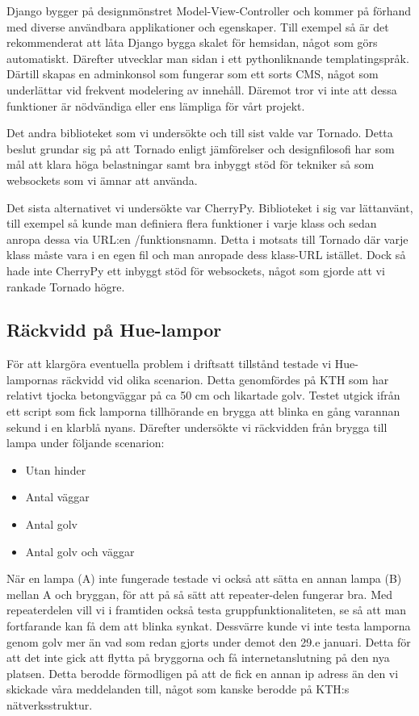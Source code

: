 \documentclass[a4paper,11pt]{article}
\begin{document}
   Django bygger på designmönstret Model-View-Controller och kommer på
   förhand med diverse användbara applikationer och egenskaper. Till exempel
   så är det rekommenderat att låta Django bygga skalet för hemsidan, något
   som görs automatiskt. Därefter utvecklar man sidan i ett pythonliknande
   templatingspråk. Därtill skapas en adminkonsol som fungerar som ett sorts
   CMS, något som underlättar vid frekvent modelering av innehåll.
   Däremot tror vi inte att dessa funktioner är nödvändiga eller ens 
   lämpliga för vårt projekt.

   Det andra biblioteket som vi undersökte och till sist valde var Tornado.
   Detta beslut grundar sig på att Tornado enligt jämförelser och
   designfilosofi har som mål att klara höga belastningar samt bra inbyggt 
   stöd för tekniker så som websockets som
   vi ämnar att använda.

   Det sista alternativet vi undersökte var CherryPy. Biblioteket i sig
   var lättanvänt, till exempel så kunde man definiera flera funktioner i
   varje klass och sedan anropa dessa via URL:en /funktionsnamn. Detta i 
   motsats till Tornado där varje klass måste vara i en egen fil och man
   anropade dess klass-URL istället. Dock så hade inte CherryPy ett inbyggt
   stöd för websockets, något som gjorde att vi rankade Tornado högre.


\subsection{Räckvidd på Hue-lampor}

   För att klargöra eventuella problem i driftsatt tillstånd testade vi Hue-
   lampornas räckvidd vid olika scenarion. Detta genomfördes på KTH som har
   relativt tjocka betongväggar på ca 50 cm och likartade golv.
   Testet utgick ifrån ett script som fick lamporna tillhörande en brygga att
   blinka en gång varannan sekund i en klarblå nyans. Därefter undersökte vi
   räckvidden från brygga till lampa under följande scenarion:

   \begin{itemize}
     \item Utan hinder
     \item Antal väggar
     \item Antal golv
     \item Antal golv och väggar
   \end{itemize}

   När en lampa (A) inte fungerade testade vi också att sätta en annan lampa (B)
   mellan A och bryggan, för att på så sätt att repeater-delen fungerar bra. Med
   repeaterdelen  vill vi i framtiden också testa gruppfunktionaliteten, se så
   att man fortfarande kan få dem att blinka synkat.
   Dessvärre kunde vi inte testa lamporna genom golv mer än vad som redan 
   gjorts under demot den 29.e januari. Detta för att det inte gick att flytta 
   på bryggorna och få internetanslutning på den nya platsen. Detta berodde 
   förmodligen på att de fick en annan ip adress än den vi skickade våra 
   meddelanden till, något som kanske berodde på KTH:s nätverksstruktur.
\end{document}

